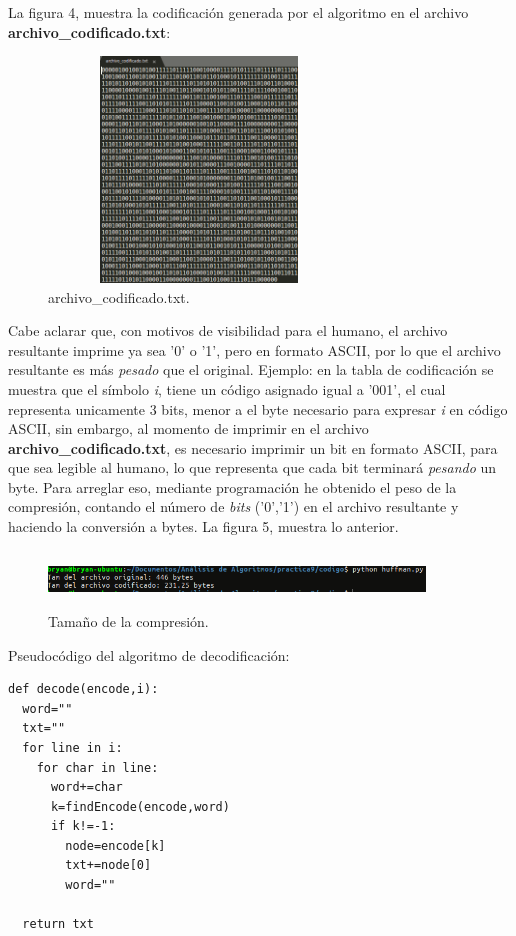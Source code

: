 \documentclass[12pt]{report}
\begin{document}
La figura 4, muestra la codificación generada por el algoritmo en el archivo \textbf{archivo\_codificado.txt}:
\begin{figure}[H]
	\includegraphics[height=6cm,width=8cm]{imagenes/4.png}
	\centering
	\caption{archivo\_codificado.txt.}
	\centering
\end{figure}

Cabe aclarar que, con motivos de visibilidad para el humano, el archivo resultante imprime ya sea '0' o '1', pero en formato ASCII, por lo que el archivo resultante es más \textit{pesado} que el original. Ejemplo: en la tabla de codificación se muestra que el símbolo \textit{i}, tiene un código asignado igual a '001', el cual representa unicamente 3 bits, menor a el byte necesario para expresar \textit{i} en código ASCII, sin embargo, al momento de imprimir en el archivo \textbf{archivo\_codificado.txt}, es necesario imprimir un bit en formato ASCII, para que sea legible al humano, lo que representa que cada bit terminará \textit{pesando} un byte. Para arreglar eso, mediante programación he obtenido el peso de la compresión, contando el número de \textit{bits} ('0','1') en el archivo resultante y haciendo la conversión a bytes. La figura 5, muestra lo anterior.

\begin{figure}[H]
	\includegraphics[width=10cm,height=1.5cm]{imagenes/5.png}
	\centering
	\caption{Tamaño de la compresión.}
	\centering
\end{figure}

 \newpage
	Pseudocódigo del algoritmo de decodificación:
	\lstset{language=python, breaklines=true, basicstyle=\footnotesize}
	\lstset{numbers=left, numberstyle=\tiny, stepnumber=1, numbersep=10pt}
	\begin{lstlisting}
def decode(encode,i):
  word=""
  txt=""
  for line in i:
    for char in line:
      word+=char
      k=findEncode(encode,word)
      if k!=-1:
        node=encode[k]
        txt+=node[0]
        word=""

  return txt
	\end{lstlisting}
	  
\end{document}
